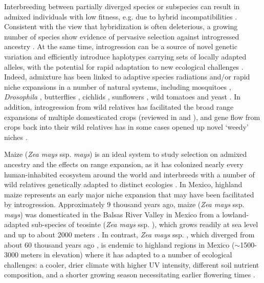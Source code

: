 Interbreeding between partially diverged species or subspecies can result in admixed individuals with low fitness, e.g. due to hybrid incompatibilities \cite{Powell:2020_dmi, Zuellig_Sweigart:2018_dmi,Presgraves_2010}. 
Consistent with the view that hybridization is often deleterious, a growing number of species show evidence of pervasive selection against introgressed ancestry \cite{Brandvain:2014cq, Aeschbacher:2017_mimulus, Kenney_Sweigart:2016_mimulus, Nelson:2021_mimulus, Martin:2019_butterflies, Edelman:2019_butterfly, Sankararaman:2014_neanderthals, Harris:2016fp, Juric:2016jj, Schumer:2018hc}. 
At the same time, introgression can be a source of novel genetic variation and efficiently introduce haplotypes carrying sets of locally adapted alleles, with the potential for rapid adaptation to new ecological challenges \cite{Pfennig:2016}. 
Indeed, admixture has been linked to adaptive species radiations and/or rapid niche expansions in a number of natural systems, including mosquitoes \cite{Fontaine:2015_mosquito}, \textit{Drosophila} \cite{Suvorov:2021_drosophila}, butterflies \cite{Edelman:2019_butterfly}, cichlids \cite{Martin:2015_cichlidradiation}, sunflowers \cite{Rieseberg:2003_sunflower}, wild tomatoes \cite{Pease:2016_tomato_radiation} and yeast \cite{Eberlein:2019_yeast, Tusso:2019_yeast}. 
In addition, introgression from wild relatives has facilitated the broad range expansions of multiple domesticated crops (reviewed in \cite{Purugganan:2019_review} and \cite{Janzen:2019}), and gene flow from crops back into their wild relatives has in some cases opened up novel ‘weedy' niches \cite{Ellstrand:2013_weeds_introgression}. 

Maize (\textit{Zea mays} ssp. \textit{mays}) is an ideal system to study selection on admixed ancestry and the effects on range expansion, as it has colonized nearly every human-inhabited ecosystem around the world \cite{Hake_Ross-Ibarra:2015} and interbreeds with a number of wild relatives genetically adapted to distinct ecologies \cite{Hufford:2012_teosinte_model_system,Mammadov:2018_teo}. 
In Mexico, highland maize represents an early major niche expansion that may have been facilitated by introgression. 
Approximately 9 thousand years ago, maize (\textit{Zea mays} ssp. \textit{mays}) was domesticated in the Balsas River Valley in Mexico from a lowland-adapted sub-species of teosinte (\textit{Zea mays} ssp. \parviglumis \cite{Piperno:2009_9kbalsas}), which grows readily at sea level and up to about 2000 meters \cite{Gonzalez:2018}. 
In contrast, \textit{Zea mays} ssp. \mexicana, which diverged from \parviglumis about 60 thousand years ago \cite{Ross-Ibarra:2009_60k}, is endemic to highland regions in Mexico ($\sim$1500-3000 meters in elevation) where it has adapted to a number of ecological challenges: a cooler, drier climate with higher UV intensity, different soil nutrient composition, and a shorter growing season necessitating earlier flowering times \cite{Fustier:2019, Fustier:2017, Aguirre-Liguori:2019, Rodriguez:2006_flowering, Piazena_1996:UV}.

